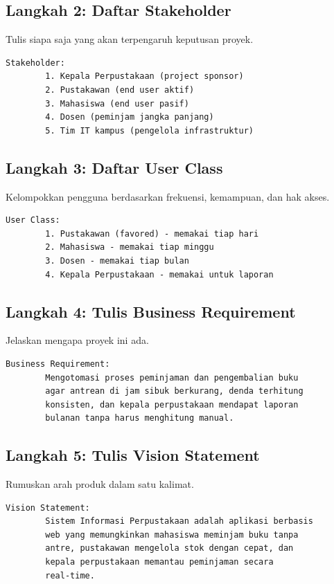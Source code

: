 \documentclass[11pt,a4paper]{article}
\begin{document}
\subsection{Langkah 2: Daftar Stakeholder}

Tulis siapa saja yang akan terpengaruh keputusan proyek.

\begin{lstlisting}[style=out]
		Stakeholder:
		1. Kepala Perpustakaan (project sponsor)
		2. Pustakawan (end user aktif)
		3. Mahasiswa (end user pasif)
		4. Dosen (peminjam jangka panjang)
		5. Tim IT kampus (pengelola infrastruktur)
	\end{lstlisting}

\subsection{Langkah 3: Daftar User Class}

Kelompokkan pengguna berdasarkan frekuensi, kemampuan, dan hak akses.

\begin{lstlisting}[style=out]
		User Class:
		1. Pustakawan (favored) - memakai tiap hari
		2. Mahasiswa - memakai tiap minggu
		3. Dosen - memakai tiap bulan
		4. Kepala Perpustakaan - memakai untuk laporan
	\end{lstlisting}

\subsection{Langkah 4: Tulis Business Requirement}

Jelaskan mengapa proyek ini ada.

\begin{lstlisting}[style=out]
		Business Requirement:
		Mengotomasi proses peminjaman dan pengembalian buku
		agar antrean di jam sibuk berkurang, denda terhitung
		konsisten, dan kepala perpustakaan mendapat laporan
		bulanan tanpa harus menghitung manual.
	\end{lstlisting}

\subsection{Langkah 5: Tulis Vision Statement}

Rumuskan arah produk dalam satu kalimat.

\begin{lstlisting}[style=out]
		Vision Statement:
		Sistem Informasi Perpustakaan adalah aplikasi berbasis
		web yang memungkinkan mahasiswa meminjam buku tanpa
		antre, pustakawan mengelola stok dengan cepat, dan
		kepala perpustakaan memantau peminjaman secara
		real-time.
	\end{lstlisting}
\end{document}
